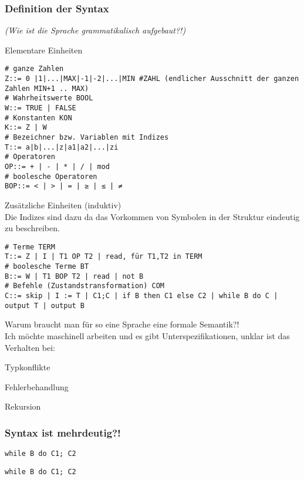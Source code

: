 \subsubsection{Definition der Syntax}
\emph{(Wie ist die Sprache grammatikalisch aufgebaut?!)}
\begin{compactitem}
	\item Elementare Einheiten\\
	\begin{lstlisting}
# ganze Zahlen
Z::= 0 |1|...|MAX|-1|-2|...|MIN #ZAHL (endlicher Ausschnitt der ganzen Zahlen MIN+1 .. MAX)
# Wahrheitswerte BOOL
W::= TRUE | FALSE
# Konstanten KON
K::= Z | W
# Bezeichner bzw. Variablen mit Indizes
T::= a|b|...|z|a1|a2|...|zi
# Operatoren
OP::= + | - | * | / | mod
# boolesche Operatoren
BOP::= < | > | = | ≥ | ≤ | ≠
	\end{lstlisting}
	\item Zusätzliche Einheiten (induktiv)\\
	Die Indizes sind dazu da das Vorkommen von Symbolen in der Struktur eindeutig zu beschreiben.\\
	\begin{lstlisting}
# Terme TERM
T::= Z | I | T1 OP T2 | read, für T1,T2 in TERM
# boolesche Terme BT
B::= W | T1 BOP T2 | read | not B
# Befehle (Zustandstransformation) COM
C::= skip | I := T | C1;C | if B then C1 else C2 | while B do C |  output T | output B
	\end{lstlisting}
\end{compactitem}
Warum braucht man für so eine Sprache eine formale Semantik?!\\
Ich möchte maschinell arbeiten und es gibt Unterspezifikationen, unklar ist das Verhalten bei:
\begin{compactitem}
\item Typkonflikte\\
\item Fehlerbehandlung\\
\item Rekursion\\
\end{compactitem}

\subsubsection*{Syntax ist mehrdeutig?!}
\begin{lstlisting}
while B do C1; C2
\end{lstlisting}
\begin{lstlisting}
while B do C1; C2
\end{lstlisting}






